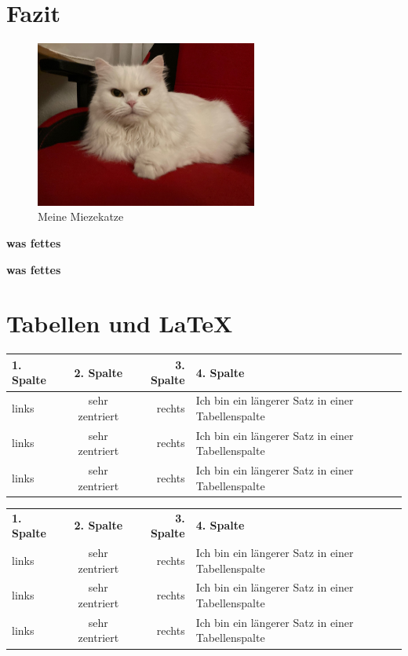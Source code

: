 \documentclass[12pt,ngerman,parskip=half]{scrartcl}
\begin{document}
\blindtext[2]

\section{Fazit}\label{sec:fazit}

\blindtext[2]


\begin{figure}[h]
\begin{center}
\includegraphics[width=0.65\textwidth,angle=90]{Bilder/Katze}
\caption{Meine Miezekatze}\label{fig:katze}
\end{center}
\end{figure}


\blindtext[2]

\textbf{was fettes}

{\bfseries was fettes}


\section{Tabellen und \LaTeX}

\begin{tabular}{|l|c|r|p{6cm}|} \hline
1. Spalte & 2. Spalte & 3. Spalte & 4. Spalte \\ \hline
links & sehr zentriert&   rechts  & Ich bin ein längerer Satz in einer Tabellenspalte  \\ \hline
links & sehr zentriert&   rechts  & Ich bin ein längerer Satz in einer Tabellenspalte  \\ \hline
links & sehr zentriert&   rechts  & Ich bin ein längerer Satz in einer Tabellenspalte  \\ \hline
\end{tabular}

\vspace*{2cm}

\begin{tabular}{lcrp{6cm}} \toprule[3pt] \addlinespace[5mm]
\textbf{1. Spalte} & \textbf{2. Spalte} & \textbf{3. Spalte} & \textbf{4. Spalte} \\ \addlinespace[5mm] \midrule 
links & sehr zentriert&   rechts  & Ich bin ein längerer Satz in einer Tabellenspalte  \\ \midrule[1pt]
links & sehr zentriert&   rechts  & Ich bin ein längerer Satz in einer Tabellenspalte  \\ 
links & sehr zentriert&   rechts  & Ich bin ein längerer Satz in einer Tabellenspalte  \\ \bottomrule[1.5pt]
\end{tabular}
\end{document}

